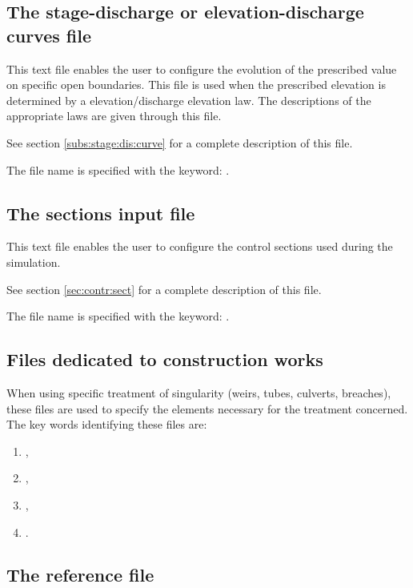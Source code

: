 \subsection{ The stage-discharge or elevation-discharge curves file}

 This text file enables the user to configure the evolution of the prescribed value on specific open boundaries. This file is used when the prescribed elevation is determined by a elevation/discharge elevation law. The descriptions of the appropriate laws are given through this file.

 See section \ref{subs:stage:dis:curve} for a complete description of this file.

 The file name is specified with the keyword: .


\subsection{ The sections input file}

 This text file enables the user to configure the control sections used during the simulation.

 See section \ref{sec:contr:sect} for a complete description of this file.

 The file name is specified with the keyword: .


\subsection{ Files dedicated to construction works}

 When using specific treatment of singularity (weirs, tubes, culverts, breaches), these files are used to specify the elements necessary for the treatment concerned. The key words identifying these files are:

\begin{enumerate}
\item  {},

\item  {},

\item  {},

\item  {}.
\end{enumerate}


\subsection{ The reference file}

